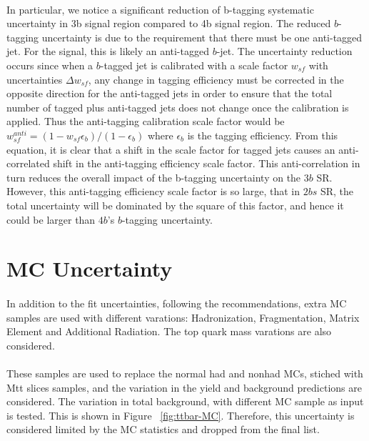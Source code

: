 \paragraph{}
In particular, we notice a significant reduction of b-tagging systematic uncertainty in 3b signal region compared to 4b signal region. 
The reduced $b$-tagging uncertainty is due to the requirement that there must be one anti-tagged jet. 
For the signal, this is likely an anti-tagged $b$-jet. 
The uncertainty reduction occurs since when a $b$-tagged jet is calibrated with a scale factor $w_{sf}$ with uncertainties $\Delta w_{sf}$, any change in tagging efficiency must be corrected in the opposite direction for the anti-tagged jets in order to ensure that the total number of tagged plus anti-tagged jets does not change once the calibration is applied. 
Thus the anti-tagging calibration scale factor would be $w_{sf}^{anti} = (1 - w_{sf} \epsilon_{b}) / (1 - \epsilon_{b}) $ where $\epsilon_{b}$ is the tagging efficiency. 
From this equation, it is clear that a shift in the scale factor for tagged jets causes an anti-correlated shift in the anti-tagging efficiency scale factor. 
This anti-correlation in turn reduces the overall impact of the b-tagging uncertainty on the $3b$ SR. 
However, this anti-tagging efficiency scale factor is so large, that in $2bs$ SR, the total uncertainty will be dominated by the square of this factor, and hence it could be larger than $4b$'s $b$-tagging uncertainty.


\section{\ttbar MC Uncertainty}
\label{sec:b-tagging-unc}

\paragraph{}
In addition to the \ttbar fit uncertainties, following the recommendations, extra \ttbar MC samples are used with different varations: Hadronization, Fragmentation, Matrix Element and Additional Radiation. The top quark mass varations are also considered. 

\paragraph{}
These \ttbar samples are used to replace the normal had and nonhad MCs, stiched with Mtt slices samples, and the variation in the \ttbar yield and background predictions are considered. The variation in total background, with different \ttbar MC sample as input is tested. This is shown in Figure ~\ref{fig:ttbar-MC}. Therefore, this uncertainty is considered limited by the MC statistics and dropped from the final list.

